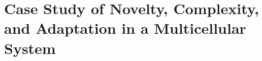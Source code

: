 \chapter{Case Study of Novelty, Complexity, and Adaptation in a Multicellular System}
\label{chap:measuring-cna}
